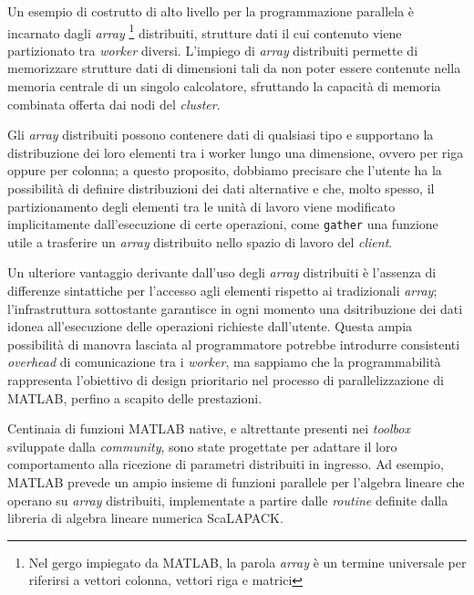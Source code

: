 Un esempio di costrutto di alto livello per la programmazione parallela \`e incarnato dagli \textit{array} 
\footnote{Nel gergo impiegato da MATLAB, la parola \textit{array} \`e un termine universale per riferirsi a vettori colonna, vettori riga e matrici} 
distribuiti, strutture dati il cui contenuto viene partizionato tra \textit{worker} diversi.\newline
L'impiego di \textit{array} distribuiti permette di memorizzare strutture dati di dimensioni tali da non poter essere contenute nella memoria centrale di un 
singolo calcolatore, sfruttando la capacit\`a di memoria combinata offerta dai nodi del \textit{cluster}.

Gli \textit{array} distribuiti possono contenere dati di qualsiasi tipo e supportano la distribuzione dei loro elementi tra i worker lungo una dimensione, ovvero 
per riga oppure per colonna; a questo proposito, dobbiamo precisare che l'utente ha la possibilit\`a di definire distribuzioni dei dati alternative e che, 
molto spesso, il partizionamento degli elementi tra le unit\`a di lavoro viene modificato implicitamente dall'esecuzione di certe operazioni, 
come \lstinline|gather| una funzione utile a trasferire un \textit{array} distribuito nello spazio di lavoro del \textit{client}.

Un ulteriore vantaggio derivante dall'uso degli \textit{array} distribuiti \`e l'assenza di differenze sintattiche per l'accesso agli elementi rispetto ai 
tradizionali \textit{array}; l'infrastruttura sottostante garantisce in ogni momento una dsitribuzione dei dati idonea all'esecuzione delle operazioni 
richieste dall'utente.\newline
Questa ampia possibilit\`a di manovra lasciata al programmatore potrebbe introdurre consistenti \textit{overhead} di comunicazione tra i \textit{worker}, 
ma sappiamo che la programmabilit\`a rappresenta l'obiettivo di design prioritario nel processo di parallelizzazione di MATLAB, perfino a scapito delle prestazioni.

Centinaia di funzioni MATLAB native, e altrettante presenti nei \textit{toolbox} sviluppate dalla \textit{community}, sono state progettate per adattare il 
loro comportamento alla ricezione di parametri distribuiti in ingresso.\newline
Ad esempio, MATLAB prevede un ampio insieme di funzioni parallele per l'algebra lineare che operano su \textit{array} distribuiti, implementate a partire dalle \textit{routine} definite dalla libreria di algebra lineare numerica ScaLAPACK.
